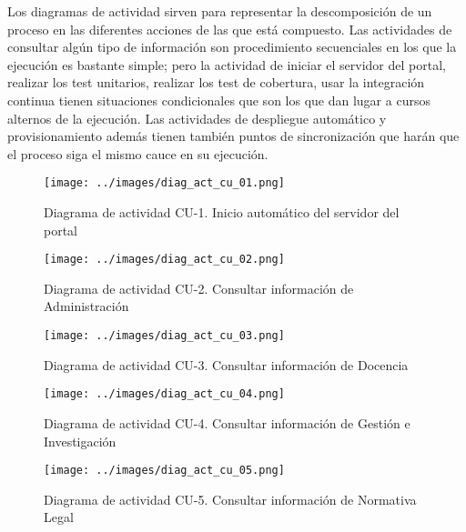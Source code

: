 Los diagramas de actividad sirven para representar la descomposición de un proceso en las diferentes acciones de las que está compuesto. Las actividades de consultar algún tipo de información son procedimiento secuenciales en los que la ejecución es bastante simple; pero la actividad de iniciar el servidor del portal, realizar los test unitarios, realizar los test de cobertura, usar la integración continua tienen situaciones condicionales que son los que dan lugar a cursos alternos de la ejecución. Las actividades de despliegue automático y provisionamiento además tienen también puntos de sincronización que harán que el proceso siga el mismo cauce en su ejecución.

\begin{figure}[!ht]
  \begin{center}
  \texttt{[image: ../images/diag\_act\_cu\_01.png]}
  \caption{Diagrama de actividad CU-1. Inicio automático del servidor del portal}
  \label{fig:diag_act_cu_01}
  \end{center}
\end{figure}

\begin{figure}[!ht]
  \begin{center}
  \texttt{[image: ../images/diag\_act\_cu\_02.png]}
  \caption{Diagrama de actividad CU-2. Consultar información de Administración}
  \label{fig:diag_act_cu_02}
  \end{center}
\end{figure}

\begin{figure}[!ht]
  \begin{center}
  \texttt{[image: ../images/diag\_act\_cu\_03.png]}
  \caption{Diagrama de actividad CU-3. Consultar información de Docencia}
  \label{fig:diag_act_cu_03}
  \end{center}
\end{figure}

\begin{figure}[!ht]
  \begin{center}
  \texttt{[image: ../images/diag\_act\_cu\_04.png]}
  \caption{Diagrama de actividad CU-4. Consultar información de Gestión e Investigación}
  \label{fig:diag_act_cu_04}
  \end{center}
\end{figure}

\begin{figure}[!ht]
  \begin{center}
  \texttt{[image: ../images/diag\_act\_cu\_05.png]}
  \caption{Diagrama de actividad CU-5. Consultar información de Normativa Legal}
  \label{fig:diag_act_cu_05}
  \end{center}
\end{figure}

